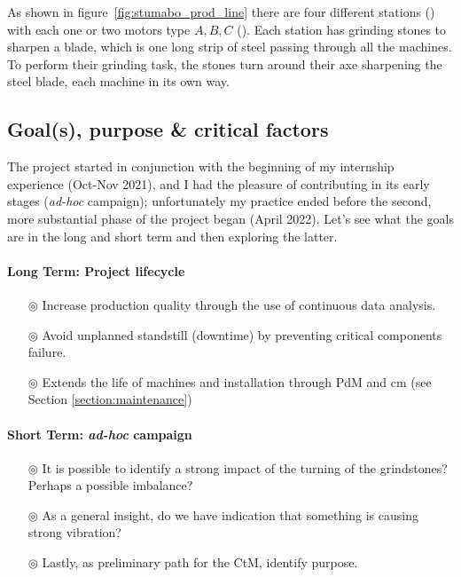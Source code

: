 As shown in figure~\ref{fig:stumabo_prod_line} there are four different stations () with each one or two motors type ${A,B,C}$ ().
Each station has grinding stones to sharpen a blade, which is one long strip of steel passing through all the machines.
To perform their grinding task, the stones turn around their axe sharpening the steel blade, each machine in its own way.

\subsection{Goal(s), purpose \& critical factors}
The project started in conjunction with the beginning of my internship experience (Oct-Nov 2021), and I had the pleasure of contributing in its early stages (\textit{ad-hoc} campaign);
unfortunately my practice ended before the second, more substantial phase of the project began (April 2022).
Let's see what the goals are in the long and short term and then exploring the latter.
\paragraph{Long Term: Project lifecycle}
\begin{itemize}
    \item[$\circledcirc$] Increase production quality through the use of continuous data analysis.
    \item[$\circledcirc$] Avoid unplanned standstill (downtime) by preventing critical components failure.
    \item[$\circledcirc$] Extends the life of machines and installation through \acl{PdM} and \acl{cm} (see Section \ref{section:maintenance})
\end{itemize}
\paragraph{Short Term: \textit{ad-hoc} campaign}
\begin{itemize}
    \item[$\circledcirc$] It is possible to identify a strong impact of the turning of the grindstones? Perhaps a possible imbalance?
    \item[$\circledcirc$] As a general insight, do we have indication that something is causing strong vibration?
    \item[$\circledcirc$] Lastly, as preliminary path for the \ac{CtM}, identify purpose.
\end{itemize}

